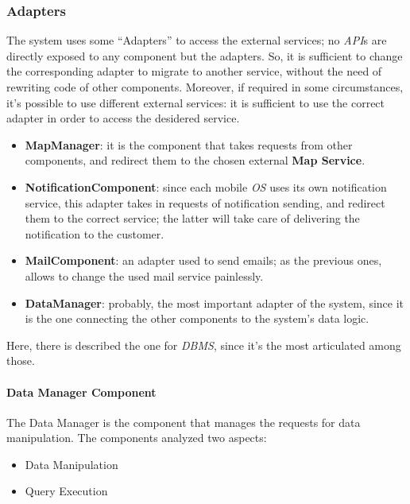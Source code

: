 \documentclass{article}
\begin{document}
		\subsubsection{Adapters}
			The system uses some “Adapters” to access the external services; no \emph{API}s are directly exposed to any component but the adapters. So, it is sufficient to change the corresponding adapter to migrate to another service, without the need of rewriting code of other components. Moreover, if required in some circumstances, it’s possible to use different external services: it is sufficient to use the correct adapter in order to access the desidered service.
			
			\begin{itemize}
				\item {\bfseries MapManager}: it is the component that takes requests from other components, and redirect them to the chosen external {\bfseries Map Service}.
				
				\item {\bfseries NotificationComponent}: since each mobile \emph{OS} uses its own notification service, this adapter takes in requests of notification sending, and redirect them to the correct service; the latter will take care of delivering the notification to the customer.
				
				\item {\bfseries MailComponent}: an adapter used to send emails; as the previous ones, allows to change the used mail service painlessly.
				
				\item {\bfseries DataManager}: probably, the most important adapter of the system, since it is the one connecting the other components to the system’s data logic. 
			\end{itemize}
		
		Here, there is described the one for \emph{DBMS}, since it’s the most articulated among those.
		
			\paragraph{Data Manager Component}
				The Data Manager is the component that manages the requests for data manipulation. The components analyzed two aspects:
				
				\begin{itemize}
					\item Data Manipulation
					\item Query Execution
				\end{itemize}
			
\end{document}
